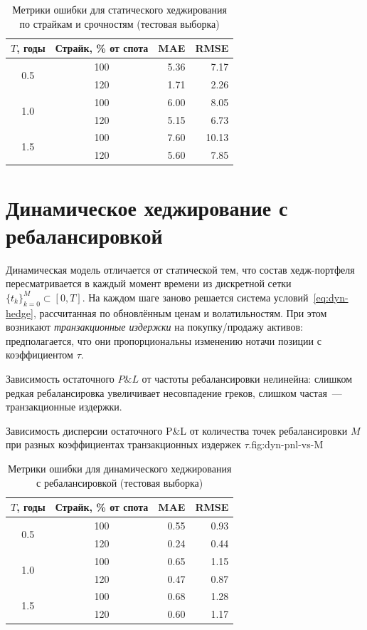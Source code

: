\begin{table}[H]
\centering
\caption{Метрики ошибки для статического хеджирования по страйкам и срочностям (тестовая выборка)}
\label{tab:metrics_static}
\begin{tabular}{ccrr}
\toprule
$T$, годы & Страйк, \% от спота & MAE & RMSE \\
\midrule
\multirow{2}{*}{0.5} & 100 & 5.36 & 7.17 \\
                     & 120 & 1.71 & 2.26 \\
\midrule
\multirow{2}{*}{1.0} & 100 & 6.00 & 8.05 \\
                     & 120 & 5.15 & 6.73 \\
\midrule
\multirow{2}{*}{1.5} & 100 & 7.60 & 10.13 \\
                     & 120 & 5.60 & 7.85 \\
\bottomrule
\end{tabular}
\end{table}

\section{Динамическое хеджирование с ребалансировкой}
\label{sec:res-dynamic}

Динамическая модель отличается от статической тем, что состав
хедж-портфеля пересматривается в каждый момент времени из дискретной
сетки $\{t_k\}_{k=0}^{M}\subset[0,T]$. На каждом шаге заново решается
система условий~\eqref{eq:dyn-hedge}, рассчитанная по обновлённым
ценам и волатильностям. При этом возникают \emph{транзакционные
издержки} на покупку/продажу активов: предполагается, что они
пропорциональны изменению нотачи позиции с коэффициентом $\tau$.

Зависимость остаточного $P\&L$ от частоты ребалансировки нелинейна:
слишком редкая ребалансировка увеличивает несовпадение греков, слишком
частая~--- транзакционные издержки.

\placeholderfig{12cm}{6cm}%
{Зависимость дисперсии остаточного P\&L от количества точек
ребалансировки $M$ при разных коэффициентах транзакционных издержек
$\tau$.}{fig:dyn-pnl-vs-M}

\begin{table}[H]
\centering
\caption{Метрики ошибки для динамического хеджирования с ребалансировкой (тестовая выборка)}
\label{tab:metrics_dynamic}
\begin{tabular}{ccrr}
\toprule
$T$, годы & Страйк, \% от спота & MAE & RMSE \\
\midrule
\multirow{2}{*}{0.5} & 100 & 0.55 & 0.93 \\
                     & 120 & 0.24 & 0.44 \\
\midrule
\multirow{2}{*}{1.0} & 100 & 0.65 & 1.15 \\
                     & 120 & 0.47 & 0.87 \\
\midrule
\multirow{2}{*}{1.5} & 100 & 0.68 & 1.28 \\
                     & 120 & 0.60 & 1.17 \\
\bottomrule
\end{tabular}
\end{table}

